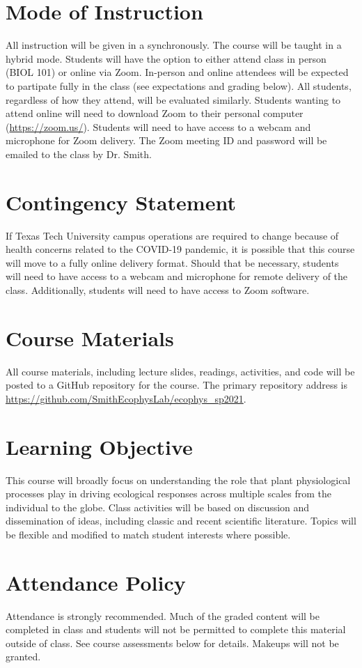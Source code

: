 \documentclass[12pt, notitlepage]{article}   	%
\begin{document}
{\section{Mode of Instruction}
All instruction will be given in a synchronously.
The course will be taught in a hybrid mode. Students will have the option to either
attend class in person (BIOL 101) or online via Zoom. In-person and online attendees
will be expected to partipate fully in the class (see expectations and grading below).
All students, regardless of how they attend, will be evaluated similarly.
Students wanting to attend online will need to download Zoom to their personal computer
(\url{https://zoom.us/}).
Students will need to have access to a webcam and microphone for Zoom delivery.
The Zoom meeting ID and password will be emailed to the class by Dr. Smith.

\section{Contingency Statement}
If Texas Tech University campus operations are required to change because of health 
concerns related to the COVID-19 pandemic, it is possible that this course will move to 
a fully online delivery format. Should that be necessary, students will need to have 
access to a webcam and microphone for remote delivery of the class. Additionally, students 
will need to have access to Zoom software.

\section{Course Materials}
All course materials, including lecture slides, readings, activities, and code 
will be posted to a GitHub repository for the course.
The primary repository address is
\url{https://github.com/SmithEcophysLab/ecophys_sp2021}.

\section{Learning Objective}
This course will broadly focus on understanding the role that plant physiological 
processes play in driving ecological responses across multiple scales from the individual 
to the globe. Class activities will be based on discussion and dissemination of ideas, 
including classic and recent scientific literature. 
Topics will be flexible and modified to match student interests where possible.

\section{Attendance Policy}
Attendance is strongly recommended. 
Much of the graded content will be completed in class and students will not be permitted
to complete this material outside of class. See course assessments below for details.
Makeups will not be granted.

}
\end{document}

